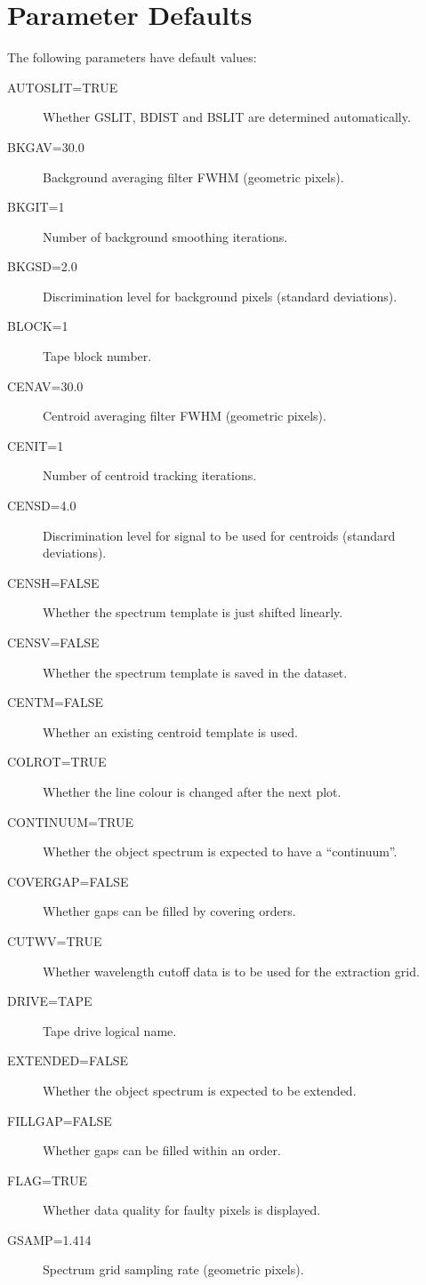 \appendix
\section {Parameter Defaults}

The following parameters have default values:

\begin {description}
\item [AUTOSLIT=TRUE] Whether GSLIT, BDIST and BSLIT are determined 
automatically.
\item [BKGAV=30.0] Background averaging filter FWHM (geometric pixels).
\item [BKGIT=1] Number of background smoothing iterations.
\item [BKGSD=2.0] Discrimination level for background pixels (standard 
deviations).
\item [BLOCK=1] Tape block number.
\item [CENAV=30.0] Centroid averaging filter FWHM (geometric pixels).
\item [CENIT=1] Number of centroid tracking iterations.
\item [CENSD=4.0] Discrimination level for signal to be used for centroids 
(standard deviations).
\item [CENSH=FALSE] Whether the spectrum template is just shifted linearly.
\item [CENSV=FALSE] Whether the spectrum template is saved in the dataset.
\item [CENTM=FALSE] Whether an existing centroid template is used.
\item [COLROT=TRUE] Whether the line colour is changed after the next plot.
\item [CONTINUUM=TRUE] Whether the object spectrum is expected to have a 
``continuum''.
\item [COVERGAP=FALSE] Whether gaps can be filled by covering orders.
\item [CUTWV=TRUE] Whether wavelength cutoff data is to be used for the 
extraction grid.
\item [DRIVE=TAPE] Tape drive logical name.
\item [EXTENDED=FALSE] Whether the object spectrum is expected to be 
extended.
\item [FILLGAP=FALSE] Whether gaps can be filled within an order.
\item [FLAG=TRUE] Whether data quality for faulty pixels is displayed.
\item [GSAMP=1.414] Spectrum grid sampling rate (geometric pixels).

\end{description}
